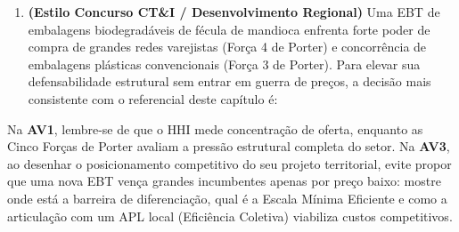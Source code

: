 \begin{enumerate}[leftmargin=1.6em, itemsep=8pt]
  \item \textbf{(Estilo Concurso CT\&I / Desenvolvimento Regional)} Uma EBT de embalagens biodegradáveis de fécula de mandioca enfrenta forte poder de compra de grandes redes varejistas (Força 4 de Porter) e concorrência de embalagens plásticas convencionais (Força 3 de Porter). Para elevar sua defensabilidade estrutural sem entrar em guerra de preços, a decisão mais consistente com o referencial deste capítulo é:
\end{enumerate}

\begin{boxDica}
Na \textbf{AV1}, lembre-se de que o $\text{HHI}$ mede concentração de oferta, enquanto as Cinco Forças de Porter avaliam a pressão estrutural completa do setor. Na \textbf{AV3}, ao desenhar o posicionamento competitivo do seu projeto territorial, evite propor que uma nova EBT vença grandes incumbentes apenas por preço baixo: mostre onde está a barreira de diferenciação, qual é a Escala Mínima Eficiente e como a articulação com um APL local (Eficiência Coletiva) viabiliza custos competitivos.
\end{boxDica}

\clearpage
{}


